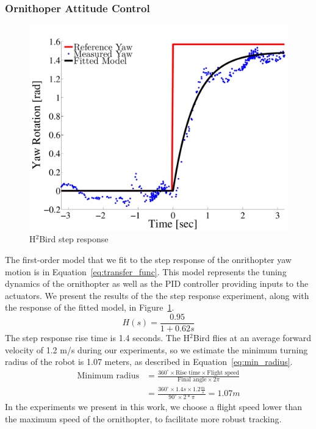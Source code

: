 \documentclass{aamas2013}
\begin{document}
\subsubsection{Ornithoper Attitude Control}
\label{sec:flight_control}
\begin{figure}[tb]
\centering
\includegraphics[width=\linewidth]{figures/step_response_total.pdf}
\caption{H$^2$Bird step response}
\label{fig:step_response}
\end{figure}

The first-order model that we fit to the step response of the onrithopter 
yaw motion is in Equation~\ref{eq:transfer_func}. This model represents the 
tuning dynamics of the ornithopter as well as the PID controller providing 
inputs to the actuators. We present the results of the the step response 
experiment, along with the response of the fitted model, in 
Figure~\ref{fig:step_response}.
\begin{equation}
\label{eq:transfer_func}
H(s) = \frac{0.95}{1+0.62s}
\end{equation}
The step response rise time is 1.4 seconds. The H$^2$Bird flies at an 
average forward velocity of 1.2 m/s during our experiments, so we estimate 
the minimum turning radius of the robot is 1.07 meters, as described in 
Equation~\ref{eq:min_radius}.
\begin{equation}
\label{eq:min_radius}
\begin{aligned}
\text{Minimum radius} & = \frac{360^{\circ}\times\text{Rise time}\times\text{Flight
speed}}{\text{Final angle}\times 2\pi}\\
& = \frac{360^{\circ}\times 1.4s\times 1.2\frac{m}{s}}{90^{\circ}\times2*\pi} = 1.07 m
\end{aligned}
\end{equation}
In the experiments we present in this work, we choose a flight speed lower 
than the maximum speed of the ornithopter, to facilitate more robust 
tracking.
\end{document}
